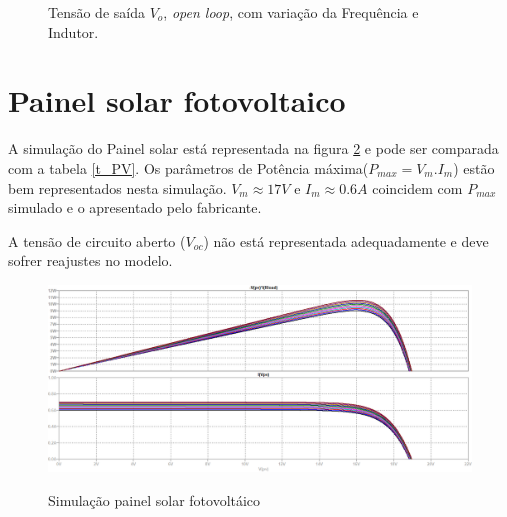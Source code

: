 \begin{figure}[H]
\centering
\caption{Tensão de saída $V_o$, \textit{open loop}, com variação da Frequência e Indutor.}
\qquad
{}
\label{fig:BuckVoAll}
\end{figure}

\section{Painel solar fotovoltaico}
A simulação do Painel solar está representada na figura \ref{FigPV} e pode ser comparada com a tabela \ref{t_PV}. Os parâmetros de Potência máxima($P_{max}=V_m.I_m$) estão bem representados nesta simulação. $V_m \approx 17V$ e $I_{m} \approx 0.6A$ coincidem com $P_{max}$ simulado e o apresentado pelo fabricante.
\par A tensão de circuito aberto ($V_{oc}$) não está representada adequadamente e deve sofrer reajustes no modelo.
\begin{figure}[H]
\caption{Simulação painel solar fotovoltáico}
 \centering %
\includegraphics[width=14cm]{figuras/PV_resultados.png} 
\label{FigPV}
\end{figure}
